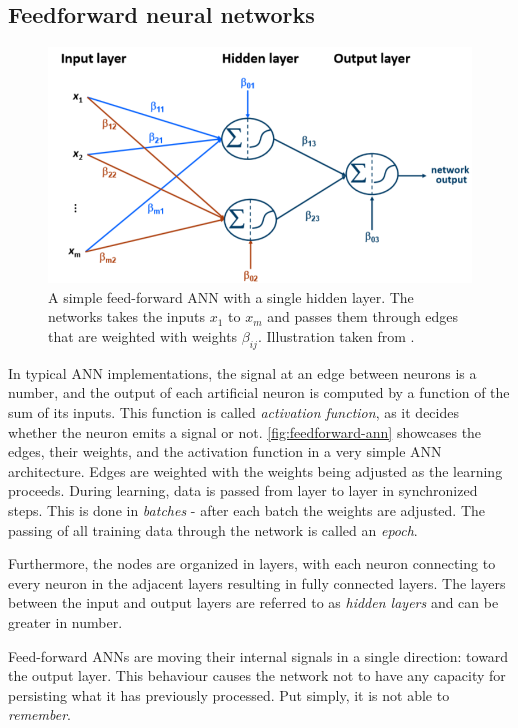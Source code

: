 \subsection{Feedforward neural networks}\label{sec:feedforward-networks}
\begin{figure}[ht!]
    \centering
    \includegraphics[width=.85\textwidth]{gfx/feedforward-neural-network.png}
    \caption{A simple feed-forward ANN with a single hidden layer. The networks takes the inputs $x_1$ to $x_m$ and passes them through edges that are weighted with weights $\beta_{ij}$. Illustration taken from \cite{lessmannBADS}.}
    \label{fig:feedforward-ann}
\end{figure}

In typical ANN implementations, the signal at an edge between neurons is a number, and the output of each artificial neuron is computed by a function of the sum of its inputs. This function is called \textit{activation function}, as it decides whether the neuron emits a signal or not. \autoref{fig:feedforward-ann} showcases the edges, their weights, and the activation function in a very simple ANN architecture. Edges are weighted with the weights being adjusted as the learning proceeds. During learning, data is passed from layer to layer in synchronized steps. This is done in \textit{batches} - after each batch the weights are adjusted. The passing of all training data through the network is called an \textit{epoch}.

Furthermore, the nodes are organized in layers, with each neuron connecting to every neuron in the adjacent layers resulting in fully connected layers. The layers between the input and output layers are referred to as \textit{hidden layers} and  can be greater in number.

Feed-forward ANNs are moving their internal signals in a single direction: toward the output layer. This behaviour causes the network not to have any capacity for persisting what it has previously processed. Put simply, it is not able to \textit{remember}.

